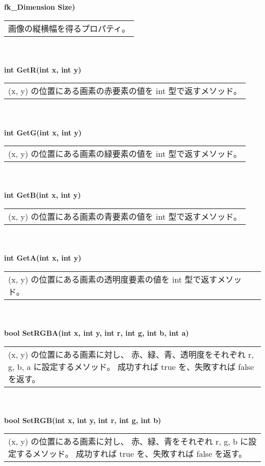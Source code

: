 \begin{tabbing}
\> \textbf{fk\_Dimension Size)} \\
	\> \> \begin{tabular}{p{15cm}}
		画像の縦横幅を得るプロパティ。
	\end{tabular} \\ \\

\> \textbf{int GetR(int x, int y)} \\
	\> \> \begin{tabular}{p{15cm}}
		(x, y) の位置にある画素の赤要素の値を int 型で返すメソッド。
	\end{tabular} \\ \\

\> \textbf{int GetG(int x, int y)} \\
	\> \> \begin{tabular}{p{15cm}}
		(x, y) の位置にある画素の緑要素の値を int 型で返すメソッド。
	\end{tabular} \\ \\

\> \textbf{int GetB(int x, int y)} \\
	\> \> \begin{tabular}{p{15cm}}
		(x, y) の位置にある画素の青要素の値を int 型で返すメソッド。
	\end{tabular} \\ \\

\> \textbf{int GetA(int x, int y)} \\
	\> \> \begin{tabular}{p{15cm}}
		(x, y) の位置にある画素の透明度要素の値を int 型で返すメソッド。
	\end{tabular} \\ \\

\> \textbf{bool SetRGBA(int x, int y, int r, int g, int b, int a)} \\
	\> \> \begin{tabular}{p{15cm}}
		(x, y) の位置にある画素に対し、
		赤、緑、青、透明度をそれぞれ r, g, b, a に設定するメソッド。
		成功すれば true を、失敗すれば false を返す。
	\end{tabular} \\ \\

\> \textbf{bool SetRGB(int x, int y, int r, int g, int b)} \\
	\> \> \begin{tabular}{p{15cm}}
		(x, y) の位置にある画素に対し、
		赤、緑、青をそれぞれ r, g, b に設定するメソッド。
		成功すれば true を、失敗すれば false を返す。
	\end{tabular} \\ \\


\end{tabbing}
